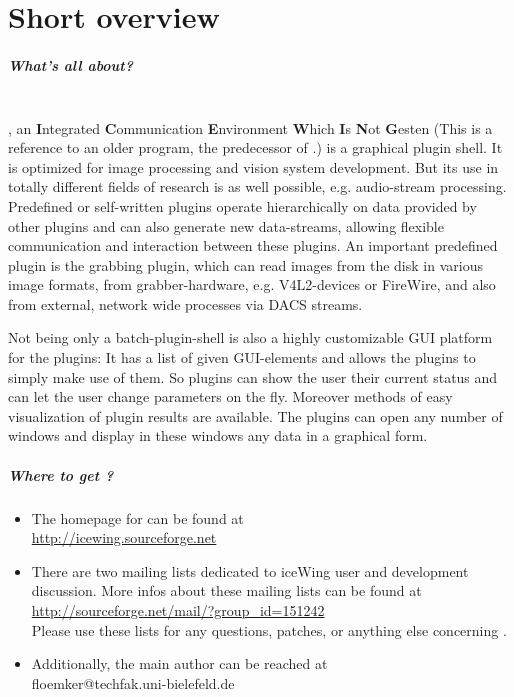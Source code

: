 \chapter{Short overview}

\paragraph{What's all about?}\hfill\\
\icewing{}, an {\bf I}ntegrated {\bf C}ommunication {\bf E}nvironment
{\bf W}hich {\bf I}s {\bf N}ot {\bf G}esten (This is
a reference to an older program, the predecessor of \icewing{}.) is
a graphical plugin shell. It is optimized for image processing and
vision system development. But its use in totally different fields
of research is as well possible, e.g. audio-stream processing.
Predefined or self-written plugins operate hierarchically on data
provided by other plugins and can also generate new data-streams,
allowing flexible communication and interaction between these
plugins. An important predefined plugin is the grabbing plugin,
which can read images from the disk in various image formats, from
grabber-hardware, e.g. V4L2-devices or FireWire, and also from
external, network wide processes via DACS streams.

Not being only a batch-plugin-shell \icewing{} is also a highly
customizable GUI platform for the plugins: It has a list of given
GUI-elements and allows the plugins to simply make use of them. So
plugins can show the user their current status and can let the user
change parameters on the fly. Moreover methods of easy visualization
of plugin results are available. The plugins can open any number of
windows and display in these windows any data in a graphical form.

\paragraph{Where to get \icewing{}?}
\begin{itemize}
\item {} The homepage for \icewing{} can be found at\\
  \hspace*{4ex}\url{http://icewing.sourceforge.net}
\item {} There are two mailing lists
  dedicated to iceWing user and development discussion. More infos
  about these mailing lists can be found at\\
  \hspace*{4ex}\url{http://sourceforge.net/mail/?group_id=151242}\\
  Please use these lists for any questions, patches, or anything
  else concerning \icewing{}.
\item Additionally, the main author can be reached at\\
  \hspace*{4ex}floemker@techfak.uni-bielefeld.de
\end{itemize}

